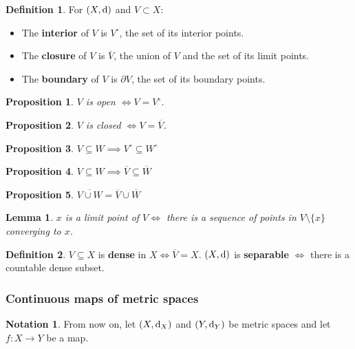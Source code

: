 \documentclass[12pt]{article}
\newtheorem{lem}[thm]{Lemma}
\newtheorem*{prop*}{Proposition}
\theoremstyle{definition}
\newtheorem{defn}{Definition}[section]
\newtheorem*{not*}{Notation}
\renewcommand{\d}{{\textnormal{d}}}
\begin{document}
\begin{defn}
	For $(X, \d)$ and $V \subset X$:
	\begin{itemize}
		\item The \textbf{interior} of $V$ is $V^{\circ}$, the set of its interior points.
		\item The \textbf{closure} of $V$ is $\overline{V}$, the union of $V$ and the set of its limit points.
		\item The \textbf{boundary} of $V$ is $\partial V$, the set of its boundary points.
	\end{itemize}
\end{defn}

\begin{prop*}
	$V$ is open $\iff V = V^{\circ}$. 
\end{prop*}

\begin{prop*}
	$V$ is closed $\iff V = \overline{V}$.
\end{prop*}

\begin{prop*}
	$V \subseteq W \implies V^{\circ} \subseteq W^{\circ}$
\end{prop*}

\begin{prop*}
	$V \subseteq W \implies \overline{V} \subseteq \overline{W}$
\end{prop*}

\begin{prop*}
	$\overline{V \cup W} = \overline{V} \cup \overline{W}$
\end{prop*}

\begin{lem}
	$x$ is a limit point of $V \iff$ there is a sequence of points in $V \setminus \{x\}$ converging to $x$.
\end{lem}

\begin{defn}
	$V \subseteq X$ is \textbf{dense} in $X \iff \overline{V} = X$.
	$(X, \d)$ is \textbf{separable} $\iff$ there is a countable dense subset.
\end{defn}

\subsubsection{Continuous maps of metric spaces}

\begin{not*}
	From now on, let $(X, \d_X)$ and $(Y, \d_Y)$ be metric spaces and let $f : X \to Y$ be a map.
\end{not*}
\end{document}
